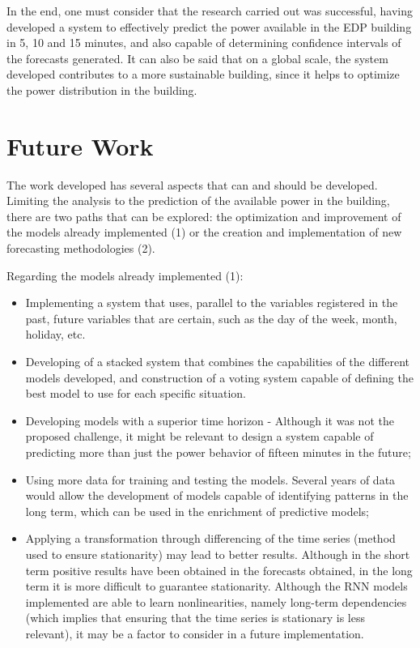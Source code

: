 In the end, one must consider that the research carried out was successful, having developed a system to effectively predict the power available in the \ac{EDP} building in 5, 10 and 15 minutes, and also capable of determining confidence intervals of the forecasts generated. It can also be said that on a global scale, the system developed contributes to a more sustainable building, since it helps to optimize the power distribution in the building.



\newpage
\section{Future Work}

The work developed has several aspects that can and should be developed. Limiting the analysis to the prediction of the available power in the building, there are two paths that can be explored: the optimization and improvement of the models already implemented (1) or the creation and implementation of new forecasting methodologies (2). 

Regarding the models already implemented (1):   

\begin{itemize}
\setlength\itemsep{0.1em}
    \item Implementing a system that uses, parallel to the variables registered in the past, future variables that are certain, such as the day of the week, month, holiday, etc.
    \item Developing of a stacked system that combines the capabilities of the different models developed, and construction of a voting system capable of defining the best model to use for each specific situation.
    \item Developing models with a superior time horizon - Although it was not the proposed challenge, it might be relevant to design a system capable of predicting more than just the power behavior of fifteen minutes in the future;
    \item Using more data for training and testing the models. Several years of data would allow the development of models capable of identifying patterns in the long term, which can be used in the enrichment of predictive models;
    \item Applying a transformation through differencing  of the time series (method used to ensure stationarity) may lead to better results. Although in the short term positive results have been obtained in the forecasts obtained, in the long term it is more difficult to guarantee stationarity. Although the \ac{RNN} models implemented are able to learn nonlinearities, namely long-term dependencies (which implies that ensuring that the time series is stationary is less relevant), it may be a factor to consider in a future implementation.
\end{itemize}

